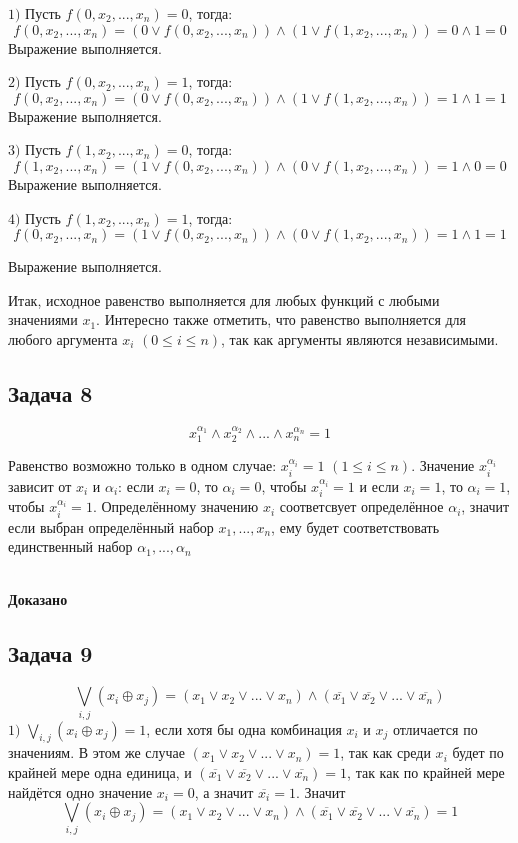 \documentclass[a4paper,12pt]{article} %
\begin{document}
$1)$ Пусть $f(0,x_2,...,x_n)=0$, тогда:
\[f(0,x_2,...,x_n)=(0\vee f(0,x_2,...,x_n))\wedge (1 \vee f(1,x_2,...,x_n))=0\wedge 1 =0\]
Выражение выполняется.

$2)$ Пусть $f(0,x_2,...,x_n)=1$, тогда:
\[f(0,x_2,...,x_n)=(0\vee f(0,x_2,...,x_n))\wedge (1 \vee f(1,x_2,...,x_n))=1\wedge 1 =1\]
Выражение выполняется.

$3)$ Пусть $f(1,x_2,...,x_n)=0$, тогда:
\[f(1,x_2,...,x_n)=(1\vee f(0,x_2,...,x_n))\wedge (0 \vee f(1,x_2,...,x_n))=1\wedge 0 =0\]
Выражение выполняется.

$4)$ Пусть $f(1,x_2,...,x_n)=1$, тогда:
\[f(0,x_2,...,x_n)=(1\vee f(0,x_2,...,x_n))\wedge (0 \vee f(1,x_2,...,x_n))=1\wedge 1 =1\]

Выражение выполняется.

Итак, исходное равенство выполняется для любых функций с любыми значениями $x_1$. Интересно также отметить, что равенство выполняется для любого аргумента $x_i$ $(0\leqslant i\leqslant n)$, так как аргументы являются независимыми.

\newpage
\begin{center}
\section*{Задача 8}
\end{center}
\[x_1^{\alpha_1}\wedge x_2^{\alpha_2} \wedge ... \wedge x_n^{\alpha_n}=1\]

Равенство возможно только в одном случае: $x_i^{\alpha_i}=1$ $(1\leqslant i\leqslant n)$. Значение $x_i^{\alpha_i}$ зависит от $x_i$ и $\alpha_i$: если $x_i=0$, то $\alpha_i=0$, чтобы $x_i^{\alpha_i}=1$ и если $x_i=1$, то $\alpha_i=1$, чтобы $x_i^{\alpha_i}=1$. Определённому значению $x_i$ соответсвует определённое $\alpha_i$, значит если выбран определённый набор $x_1,...,x_n$, ему будет соответствовать единственный набор $\alpha_1,...,\alpha_n$ \\\\
\begin{flushright}
\begin{large}
\textbf {Доказано}
\end{large}
\end{flushright}

\begin{center}
\section*{Задача 9}
\end{center}
\[\bigvee \limits_{i, j} (x_i\oplus x_j)=(x_1\vee x_2 \vee ... \vee x_n)\wedge (\overline{x_1} \vee \overline{x_2} \vee ... \vee \overline{x_n}) \]
$1)$ $\bigvee \limits_{i, j} (x_i\oplus x_j)=1$, если хотя бы одна комбинация $x_i$ и $x_j$ отличается по значениям. В этом же случае $(x_1\vee x_2 \vee ... \vee x_n)=1$, так как среди $x_i$ будет по крайней мере одна единица, и $(\overline{x_1} \vee \overline{x_2} \vee ... \vee \overline{x_n})= 1$, так как по крайней мере найдётся одно значение $x_i=0$, а значит $\overline{x_i}=1$. Значит
\[\bigvee \limits_{i, j} (x_i\oplus x_j)=(x_1\vee x_2 \vee ... \vee x_n)\wedge (\overline{x_1} \vee \overline{x_2} \vee ... \vee \overline{x_n})=1 \]
\end{document}
